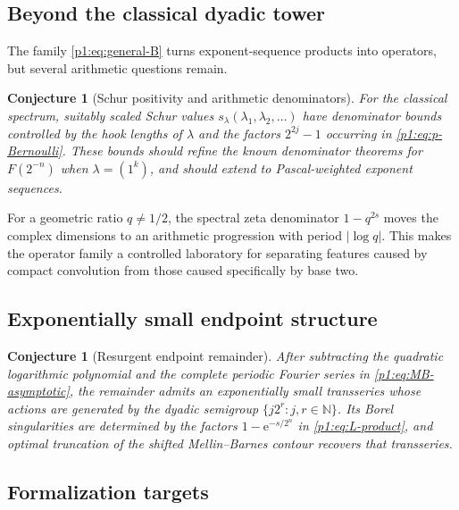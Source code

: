 \documentclass[11pt,oneside]{article}
\newtheorem{conjecture}[theorem]{Conjecture}
\theoremstyle{definition}
\newcommand{\e}{\mathrm e}
\newcommand{\N}{\mathbb N}
\begin{document}
\subsection{Beyond the classical dyadic tower}

The family \eqref{p1:eq:general-B} turns exponent-sequence products into operators, but
several arithmetic questions remain.

\begin{conjecture}[Schur positivity and arithmetic denominators]
\label{p1:conj:Schur-arithmetic}
For the classical spectrum, suitably scaled Schur values
\(s_{\lambda}(\lambda_1,\lambda_2,\ldots)\) have denominator bounds controlled by the
hook lengths of \(\lambda\) and the factors \(2^{2j}-1\) occurring in
\eqref{p1:eq:p-Bernoulli}.  These bounds should refine the known denominator theorems for
\(F(2^{-n})\) when \(\lambda=(1^k)\), and should extend to Pascal-weighted exponent
sequences.
\end{conjecture}

For a geometric ratio \(q\ne1/2\), the spectral zeta denominator
\(1-q^{2s}\) moves the complex dimensions to an arithmetic progression with period
\(|\log q|\).  This makes the operator family a controlled laboratory for separating
features caused by compact convolution from those caused specifically by base two.

\subsection{Exponentially small endpoint structure}

\begin{conjecture}[Resurgent endpoint remainder]
\label{p1:conj:resurgence}
After subtracting the quadratic logarithmic polynomial and the complete periodic
Fourier series in \eqref{p1:eq:MB-asymptotic}, the remainder admits an exponentially
small transseries whose actions are generated by the dyadic semigroup
\(\{j2^r:j,r\in\N\}\).  Its Borel singularities are determined by the factors
\(1-\e^{-s/2^n}\) in \eqref{p1:eq:L-product}, and optimal truncation of the shifted
Mellin--Barnes contour recovers that transseries.
\end{conjecture}

\subsection{Formalization targets}
\end{document}
